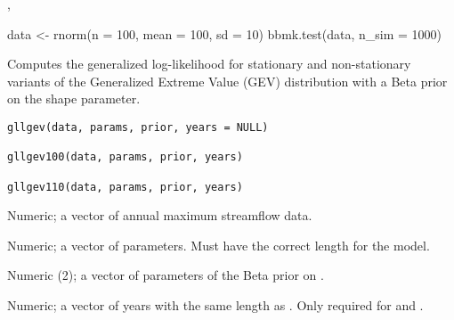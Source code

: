 \documentclass[a4paper]{book}
\begin{document}
%
\begin{SeeAlso}
, 
\end{SeeAlso}
%
\begin{Examples}
\begin{ExampleCode}
data <- rnorm(n = 100, mean = 100, sd = 10)
bbmk.test(data, n_sim = 1000)

\end{ExampleCode}
\end{Examples}
%
\begin{Description}
Computes the generalized log-likelihood for stationary and non-stationary variants of the
Generalized Extreme Value (GEV) distribution with a Beta prior on the shape parameter.
\end{Description}
%
\begin{Usage}
\begin{verbatim}
gllgev(data, params, prior, years = NULL)

gllgev100(data, params, prior, years)

gllgev110(data, params, prior, years)
\end{verbatim}
\end{Usage}
%
\begin{Arguments}
\begin{ldescription}
\item[\code{data}] Numeric; a vector of annual maximum streamflow data.

\item[\code{params}] Numeric; a vector of parameters. Must have the correct length for the model.

\item[\code{prior}] Numeric (2); a vector of parameters of the Beta prior on \eqn{\kappa}{}.

\item[\code{years}] Numeric; a vector of years with the same length as .
Only required for  and .
\end{ldescription}
\end{Arguments}
%
\end{document}
